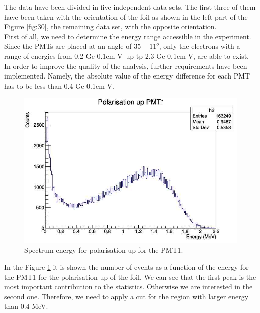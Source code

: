 \documentclass[10pt,swedish, openany]{book}
\def\MeV{\ifmmode {\mathrm{\ Me\kern -0.1em V}}\else
                   \textrm{Ge\kern -0.1em V}\fi}%
\begin{document}
The data have been divided in five independent data sets. The first three of them have been taken with the orientation of the foil as shown in the left part of the Figure \ref{fig:30}, the remaining data set, with the opposite orientation.\\

First of all, we need to determine the energy range accessible in the experiment. Since the PMTs are placed at an angle of $35\pm 11 ^o$, only the electrons with a range of energies from 0.2 \MeV~up tp 2.3 \MeV, are able to exist.\\

In order to improve the quality of the analysis, further requirements have been implemented. Namely, the absolute value of the energy difference for each PMT has to be less than 0.4 \MeV.

\begin{figure}[H]
\includegraphics[scale=0.3]{upPMT1.jpg}
\centering
\caption{Spectrum energy for polarisation up for the PMT1.}
\label{fig:up}
\end{figure}

In the Figure \ref{fig:up} it is shown the number of events as a function of the energy for the PMT1 for the polarisation up of the foil. We can see that the first peak is the most important contribution to the statistics. Otherwise we are interested in the second one. Therefore, we need to apply a cut for the region with larger energy than 0.4 MeV.
\end{document}
